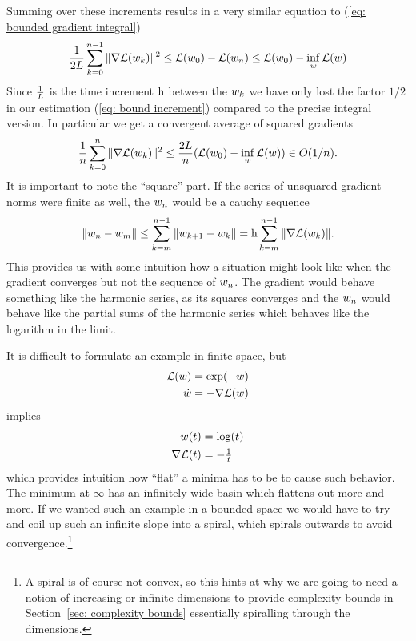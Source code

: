Summing over these increments results in a very similar equation to
(\ref{eq: bounded gradient integral})
%
\begin{align*}
	\frac{1}{2L} \sum_{k=0}^{n-1}\|\nabla \mathcal{L}(w_k)\|^2
	\le \mathcal{L}(w_0) - \mathcal{L}(w_n)
	\le \mathcal{L}(w_0) - \inf_{w} \mathcal{L}(w)
\end{align*}
%
Since \(\tfrac{1}{L}\) is the time increment \(\text{h}\) between the \(w_k\)
we have only lost the factor \(1/2\) in our estimation (\ref{eq: bound increment})
compared to the precise integral version.
In particular we get a convergent average of squared gradients
%
\begin{align*}
	\frac{1}{n} \sum_{k=0}^n \|\nabla \mathcal{L}(w_k)\|^2
	\le \frac{2 L}{n} (\mathcal{L}(w_0) - \inf_w \mathcal{L}(w)) \in O(1/n).
\end{align*}
%
It is important to note the ``square'' part. If the series of unsquared gradient
norms were finite as well, the \(w_n\) would be a cauchy sequence
%
\begin{align*}
	\|w_n - w_m \|
	\le \sum_{k=m}^{n-1} \|w_{k+1} - w_k\|
	= \text{h} \sum_{k=m}^{n-1} \|\nabla \mathcal{L}(w_k)\|.
\end{align*}
%
This provides us with some intuition how a situation might look like when the
gradient converges but not the sequence of \(w_n\). The gradient would
behave something like the harmonic series, as its squares converges and the
\(w_n\) would behave like the partial sums of the harmonic series which
behaves like the logarithm in the limit.

It is difficult to formulate an example in finite space, but
%
\begin{align*}
	\mathcal{L}(w) &= \exp(-w) \\
	\dot{w} &= -\nabla \mathcal{L}(w)
\end{align*}
%
implies
%
\begin{align*}
	w(t) &= \log(t)\\
	\nabla \mathcal{L}(t) &= -\tfrac1t
\end{align*}
%
which provides intuition how ``flat'' a minima has to be to cause such behavior.
The minimum at \(\infty\) has an infinitely wide basin which flattens out
more and more. If we wanted such an example in a bounded space we would have
to try and coil up such an infinite slope into a spiral, which spirals outwards
to avoid convergence.\footnote{A spiral is of course not convex, so this hints
at why we are going to need a notion of increasing or infinite dimensions to
provide complexity bounds in Section~\ref{sec: complexity bounds} essentially
spiralling through the dimensions.}


